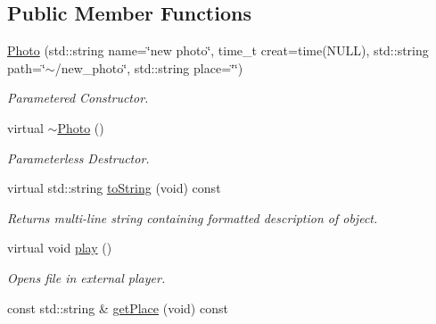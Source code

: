 \subsection*{Public Member Functions}
\begin{DoxyCompactItemize}
\item 
\hypertarget{classPhoto_a77533515f74784f105299a7fe911833a}{\hyperlink{classPhoto_a77533515f74784f105299a7fe911833a}{Photo} (std\-::string name=\char`\"{}new photo\char`\"{}, time\-\_\-t creat=time(N\-U\-L\-L), std\-::string path=\char`\"{}$\sim$/new\-\_\-photo\char`\"{}, std\-::string place=\char`\"{}\char`\"{})}\label{classPhoto_a77533515f74784f105299a7fe911833a}

\begin{DoxyCompactList}\small\item\em Parametered Constructor. \end{DoxyCompactList}\item 
virtual \hyperlink{classPhoto_adc366234be6226600360c7cbba8e7fcf}{$\sim$\-Photo} ()
\begin{DoxyCompactList}\small\item\em Parameterless Destructor. \end{DoxyCompactList}\item 
\hypertarget{classPhoto_a8be4be2bb68b6db13ec45ff3bed71481}{virtual std\-::string \hyperlink{classPhoto_a8be4be2bb68b6db13ec45ff3bed71481}{to\-String} (void) const }\label{classPhoto_a8be4be2bb68b6db13ec45ff3bed71481}

\begin{DoxyCompactList}\small\item\em Returns multi-\/line string containing formatted description of object. \end{DoxyCompactList}\item 
\hypertarget{classPhoto_a145e0540284cbc678ef5bdb02a8fcaa8}{virtual void \hyperlink{classPhoto_a145e0540284cbc678ef5bdb02a8fcaa8}{play} ()}\label{classPhoto_a145e0540284cbc678ef5bdb02a8fcaa8}

\begin{DoxyCompactList}\small\item\em Opens file in external player. \end{DoxyCompactList}\item 
\hypertarget{classPhoto_a310123a0d107ab078bc83a80b484e2c1}{const std\-::string \& \hyperlink{classPhoto_a310123a0d107ab078bc83a80b484e2c1}{get\-Place} (void) const }\label{classPhoto_a310123a0d107ab078bc83a80b484e2c1}


\end{DoxyCompactItemize}
